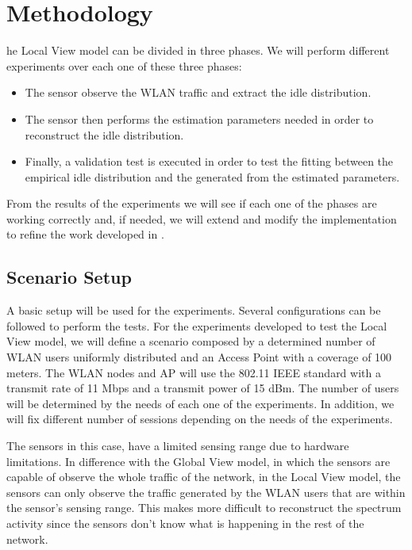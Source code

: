\section{Methodology} \label{sec:localview_methodology}
he Local View model can be divided in three phases. We will perform different experiments over each one of these three phases:

\begin{itemize}
	\item The sensor observe the \acs{WLAN} traffic and extract the idle distribution.
	\item The sensor then performs the estimation parameters needed in order to reconstruct the idle distribution.
	\item Finally, a validation test is executed in order to test the fitting between the empirical idle distribution and the generated from the estimated parameters.
\end{itemize}

From the results of the experiments we will see if each one of the phases are working correctly and, if needed, we will extend and modify the implementation to refine the work developed in \cite{marcello}.


\subsection{Scenario Setup} \label{subsec:localview_scenario_setup}
A basic setup will be used for the experiments. Several configurations can be followed to perform the tests. For the experiments developed to test the Local View model, we will define a scenario composed by a determined number of \acs{WLAN} users uniformly distributed and an Access Point with a coverage of 100 meters. The \acs{WLAN} nodes and \acs{AP} will use the 802.11 \acs{IEEE} standard with a transmit rate of 11 Mbps and a transmit power of 15 dBm. The number of users will be determined by the needs of each one of the experiments. In addition, we will fix different number of sessions depending on the needs of the experiments.

The sensors in this case, have a limited sensing range due to hardware limitations. In difference with the Global View model, in which the sensors are capable of observe the whole traffic of the network, in the Local View model, the sensors can only observe the traffic generated by the \acs{WLAN} users that are within the sensor's sensing range. This makes more difficult to reconstruct the spectrum activity since the sensors don't know what is happening in the rest of the network.

